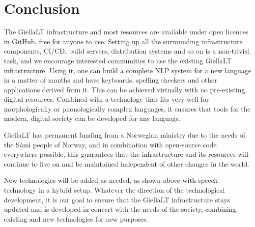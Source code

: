 \documentclass[free]{flammie}
\begin{document}
\section{Conclusion}

The GiellaLT infrastructure and most resources are available under open licences in
GitHub, free for anyone to use. Setting up all the surrounding infrastructure components,
CI/CD, build servers, distribution systems and so on is a non-trivial task, and we encourage
interested communities to use the existing GiellaLT infrastructure. Using it, one can build
a complete NLP system for a new language in a matter of months and have keyboards,
spelling checkers and other applications derived from it. This can be achieved virtually
with no pre-existing digital resources. Combined with a technology that fits very well for
morphologically or phonologically complex languages, it ensures that tools for the modern,
digital society can be developed for any language.

GiellaLT has permanent funding from a Norwegian ministry due to the needs of the
Sámi people of Norway, and in combination with open-source code everywhere possible,
this guarantees that the infrastructure and its resources will continue to live on and be maintained independent of other changes in the world.

New technologies will be added as needed, as shown above with speech technology in
a hybrid setup. Whatever the direction of the technological development, it is our goal to
ensure that the GiellaLT infrastructure stays updated and is developed in concert with the
needs of the society, combining existing and new technologies for new purposes.




\end{document}
